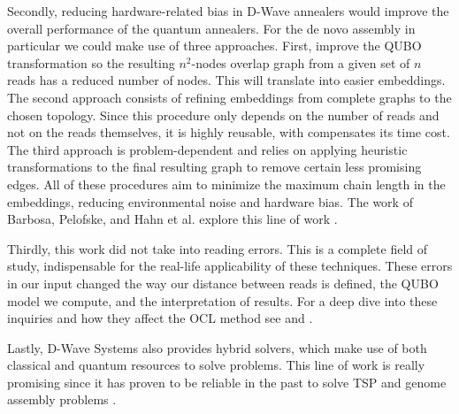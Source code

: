Secondly, reducing hardware-related bias in D-Wave annealers would improve the overall performance of the quantum annealers. For the de novo assembly in particular we could make use of three approaches. First, improve the QUBO transformation so the resulting $n^2$-nodes overlap graph from a given set of $n$ reads has a reduced number of nodes. This will translate into easier embeddings. The second approach consists of refining embeddings from complete graphs to the chosen topology. Since this procedure only depends on the number of reads and not on the reads themselves, it is highly reusable, with compensates its time cost. The third approach is problem-dependent and relies on applying heuristic transformations to the final resulting graph to remove certain less promising edges. All of these procedures aim to minimize the maximum chain length in the embeddings, reducing environmental noise and hardware bias. The work of Barbosa, Pelofske, and Hahn et al. explore this line of work \cite{Barbosa2021}.

Thirdly, this work did not take into reading errors. This is a complete field of study, indispensable for the real-life applicability of these techniques. These errors in our input changed the way our distance between reads is defined, the QUBO model we compute, and the interpretation of results. For a deep dive into these inquiries and how they affect the OCL method see \cite{Koren2012} and \cite{Li2012}.

Lastly, D-Wave Systems also provides hybrid solvers, which make use of both classical and quantum resources to solve problems. This line of work is really promising since it has proven to be reliable in the past to solve TSP and genome assembly problems \cite{Sarkar2020} \cite{Warren2021}.
